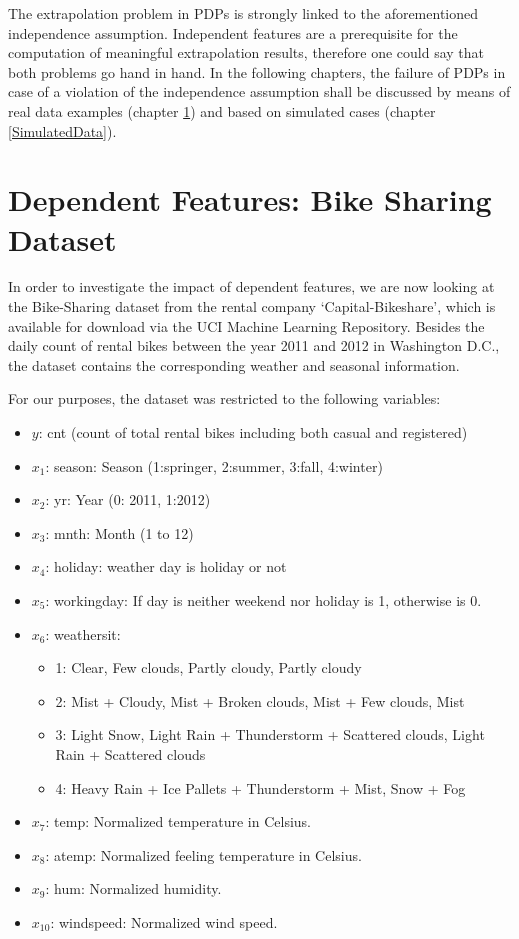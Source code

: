 \documentclass[
]{krantz}
\providecommand{\tightlist}{%
  \setlength{\itemsep}{0pt}\setlength{\parskip}{0pt}}
\begin{document}
The extrapolation problem in PDPs is strongly linked to the aforementioned independence assumption. Independent features are a prerequisite for the computation of meaningful extrapolation results, therefore one could say that both problems go hand in hand. In the following chapters, the failure of PDPs in case of a violation of the independence assumption shall be discussed by means of real data examples (chapter \ref{RealData}) and based on simulated cases (chapter \ref{SimulatedData}).

\hypertarget{RealData}{%
\section{Dependent Features: Bike Sharing Dataset}\label{RealData}}

In order to investigate the impact of dependent features, we are now looking at the Bike-Sharing dataset from the rental company `Capital-Bikeshare', which is available for download via the UCI Machine Learning Repository. Besides the daily count of rental bikes between the year 2011 and 2012 in Washington D.C., the dataset contains the corresponding weather and seasonal information.\citep{Fanaee-T}

For our purposes, the dataset was restricted to the following variables:

\begin{itemize}
\tightlist
\item
  \(y\): cnt (count of total rental bikes including both casual and registered)
\item
  \(x_1\): season: Season (1:springer, 2:summer, 3:fall, 4:winter)
\item
  \(x_2\): yr: Year (0: 2011, 1:2012)
\item
  \(x_3\): mnth: Month (1 to 12)
\item
  \(x_4\): holiday: weather day is holiday or not
\item
  \(x_5\): workingday: If day is neither weekend nor holiday is 1, otherwise is 0.
\item
  \(x_6\): weathersit:

  \begin{itemize}
  \tightlist
  \item
    1: Clear, Few clouds, Partly cloudy, Partly cloudy
  \item
    2: Mist + Cloudy, Mist + Broken clouds, Mist + Few clouds, Mist
  \item
    3: Light Snow, Light Rain + Thunderstorm + Scattered clouds, Light Rain + Scattered clouds
  \item
    4: Heavy Rain + Ice Pallets + Thunderstorm + Mist, Snow + Fog
  \end{itemize}
\item
  \(x_7\): temp: Normalized temperature in Celsius.
\item
  \(x_8\): atemp: Normalized feeling temperature in Celsius.
\item
  \(x_9\): hum: Normalized humidity.
\item
  \(x_{10}\): windspeed: Normalized wind speed.
\end{itemize}
\end{document}
